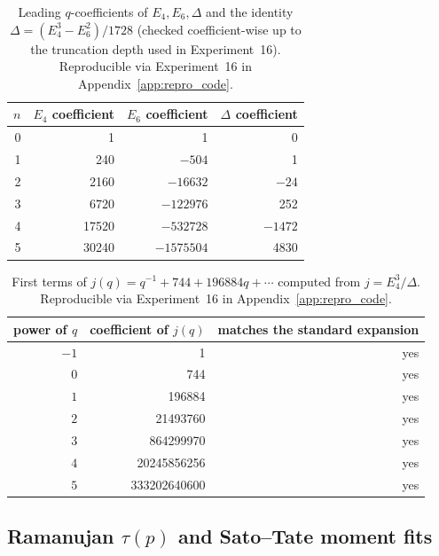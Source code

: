 \begin{table}[H]
\centering
\begin{tabular}{rrrr}
\toprule
$n$ & $E_4$ coefficient & $E_6$ coefficient & $\Delta$ coefficient \\
\midrule
0 & 1 & 1 & 0 \\
1 & 240 & $-504$ & 1 \\
2 & 2160 & $-16632$ & $-24$ \\
3 & 6720 & $-122976$ & 252 \\
4 & 17520 & $-532728$ & $-1472$ \\
5 & 30240 & $-1575504$ & 4830 \\
\bottomrule
\end{tabular}
\caption{Leading $q$-coefficients of $E_4,E_6,\Delta$ and the identity $\Delta=(E_4^3-E_6^2)/1728$ (checked coefficient-wise up to the truncation depth used in Experiment~16). Reproducible via Experiment~16 in Appendix~\ref{app:repro_code}.}
\label{tab:qexp_integrality_e4e6delta}
\end{table}

\begin{table}[H]
\centering
\begin{tabular}{rrr}
\toprule
power of $q$ & coefficient of $j(q)$ & matches the standard expansion \\
\midrule
$-1$ & 1 & yes \\
$0$ & 744 & yes \\
$1$ & 196884 & yes \\
$2$ & 21493760 & yes \\
$3$ & 864299970 & yes \\
$4$ & 20245856256 & yes \\
$5$ & 333202640600 & yes \\
\bottomrule
\end{tabular}
\caption{First terms of $j(q)=q^{-1}+744+196884q+\cdots$ computed from $j=E_4^3/\Delta$. Reproducible via Experiment~16 in Appendix~\ref{app:repro_code}.}
\label{tab:qexp_integrality_j}
\end{table}

\subsection{Ramanujan \texorpdfstring{$\tau(p)$}{tau(p)} and Sato--Tate moment fits}
\label{app:quant_fits_sato_tate}

